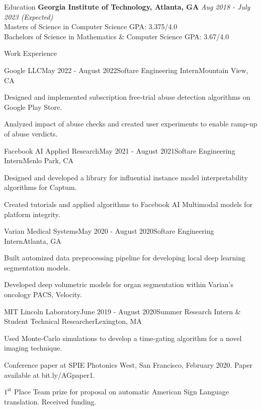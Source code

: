 \documentclass{template} %
\begin{document}

\begin{rSection}{Education}
{\bf Georgia Institute of Technology, Atlanta, GA} \hfill {\em Aug 2018 - July 2023 (Expected)}
\\ Masters of Science in Computer Science \hfill  GPA: 3.375/4.0
\\ Bachelors of Science in Mathematics \& Computer Science \hfill  GPA: 3.67/4.0
\end{rSection}


\begin{rSection}{Work Experience}

\begin{rSubsection}{Google LLC}{May 2022 - August 2022}{Softare Engineering Intern}{Mountain View, CA}
\item Designed and implemented subscription free-trial abuse detection algorithms on Google Play Store.
\item Analyzed impact of abuse checks and created user experiments to enable ramp-up of abuse verdicts.
\end{rSubsection}

\begin{rSubsection}{Facebook AI Applied Research}{May 2021 - August 2021}{Softare Engineering Intern}{Menlo Park, CA}
\item Designed and developed a library for influential instance model interpretability algorithms for Captum.
\item Created tutorials and applied algorithms to Facebook AI Multimodal models for platform integrity. 
\end{rSubsection}

\begin{rSubsection}{Varian Medical Systems}{May 2020 - August 2020}{Softare Engineering Intern}{Atlanta, GA}
\item Built automized data preprocessing pipeline for developing local deep learning segmentation models.
\item Developed deep volumetric models for organ segmentation within Varian's oncology PACS, Velocity.
\end{rSubsection}

\begin{rSubsection}{MIT Lincoln Laboratory}{June 2019 - August 2020}{Summer Research Intern \& Student Technical Researcher}{Lexington, MA}
\item Used Monte-Carlo simulations to develop a time-gating algorithm for a novel imaging technique.
\item Conference paper at SPIE Photonics West, San Francisco, February 2020. Paper available at bit.ly/AGpaper1.
\item$1^{\text{st}}$ Place Team prize for proposal on automatic American Sign Language translation. Received funding.
\end{rSubsection}

\end{rSection}
\vspace{-2mm}
\end{document}
